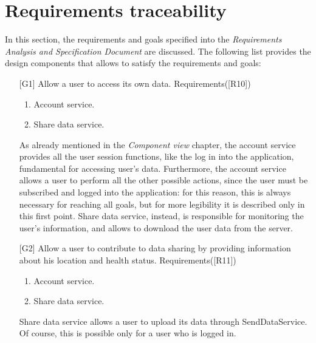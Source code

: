 \section{Requirements traceability}
In this section, the requirements and goals specified into the \textit{Requirements Analysis and Specification Document} are discussed. 
The following list provides the design components that allows to satisfy the requirements and goals: 
\begin{itemize}
\item[{[G1]}] Allow a user to access its own data. Requirements([R10])
	\begin{enumerate}
	\item Account service.
	\item Share data service.
	\end{enumerate}
As already mentioned in the \textit{Component view} chapter, the account service provides all the user session functions, like the log in into
the application, fundamental for accessing user's data. 
Furthermore, the account service allows a user to perform all the other possible actions, since the user must be subscribed and logged into
the application: for this reason, this is always necessary for reaching all goals, but for more legibility it is described only in this first
point. 
Share data service, instead, is responsible for monitoring the user's information, and allows to download the user data from the server.

\item[{[G2]}] Allow a user to contribute to data sharing by providing information about his location and health status. Requirements([R11])
	\begin{enumerate}
	\item Account service.
	\item Share data service.
	\end{enumerate}
Share data service allows a user to upload its data through SendDataService. 
Of course, this is possible only for a user who is logged in. 


\end{itemize}

